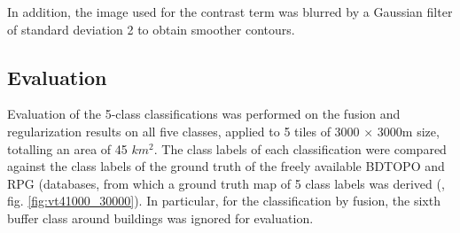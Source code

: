 \documentclass[10pt]{article}
\newcommand{\tile}{41000_30000}
\begin{document}
In addition, the image used for the contrast term was blurred by a Gaussian filter of standard deviation 2 to obtain smoother contours.

\subsection{Evaluation}

Evaluation of the 5-class classifications was performed on the fusion and regularization results on all five classes, applied to 5 tiles of 3000 $\times$ 3000m size, totalling an area of 45 $km^2$. The class labels of each classification were compared against the class labels of the ground truth of the freely available BDTOPO and RPG (databases, from which a ground truth map of 5 class labels was derived (\cite{bdtopo,RPG}, fig. \ref{fig:vt\tile}). In particular, for the classification by fusion, the sixth buffer class around buildings was ignored for evaluation.\\
\end{document}

